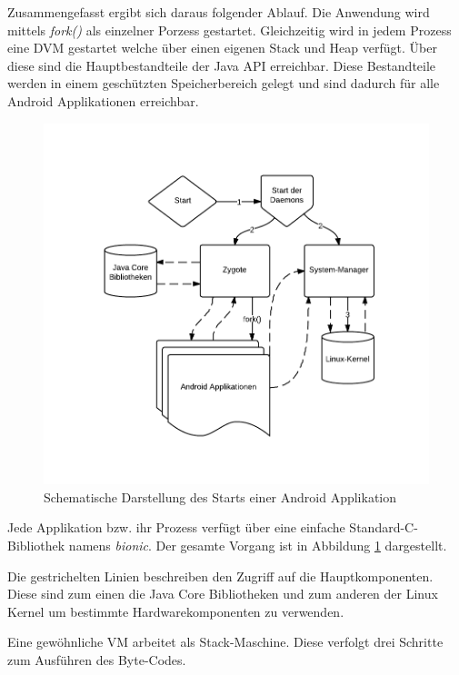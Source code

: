  Zusammengefasst ergibt sich daraus folgender Ablauf. Die Anwendung wird mittels \textit{fork()} als einzelner Porzess gestartet. Gleichzeitig wird in jedem Prozess eine DVM gestartet welche über einen eigenen Stack und Heap verfügt. Über diese sind die Hauptbestandteile der Java API erreichbar. Diese Bestandteile werden in einem geschützten Speicherbereich gelegt und sind dadurch für alle Android Applikationen erreichbar.
 
 \begin{figure}[h!t]
 \begin{center}
 \includegraphics[scale=0.5]{images/dvm}
 \caption{Schematische Darstellung des Starts einer Android Applikation}
 \label{dvm}
 \end{center}
 \end{figure}
 
 Jede Applikation bzw. ihr Prozess verfügt über eine einfache Standard-C-Bibliothek namens \textit{bionic}. Der gesamte Vorgang ist in Abbildung \ref{dvm} dargestellt.
 
 Die gestrichelten Linien beschreiben den Zugriff auf die Hauptkomponenten. Diese sind zum einen die Java Core Bibliotheken und zum anderen der Linux Kernel um bestimmte Hardwarekomponenten zu verwenden.
 
 Eine gewöhnliche VM arbeitet als Stack-Maschine. Diese verfolgt drei Schritte zum Ausführen des Byte-Codes.

